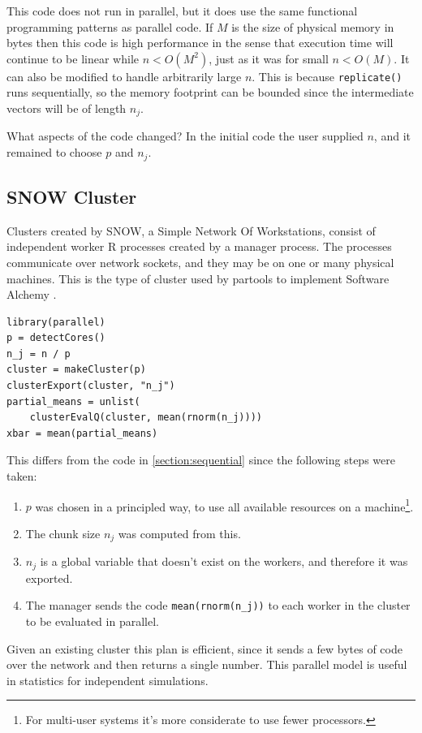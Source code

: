 \documentclass[12pt]{article}
\begin{document}
This code does not run in parallel, but it does use the same functional
programming patterns as parallel code. If $M$ is the size of physical memory in
bytes then this code is high performance in the sense
that execution time will continue to be linear while $n < O(M^2)$, just
as it was for small $n < O(M)$. It can also be modified to handle
arbitrarily large $n$. This is because \texttt{replicate()} runs
sequentially, so the memory footprint can be bounded since the intermediate
vectors will be of length $n_j$. 

What aspects of the code changed? In the initial code the user
supplied $n$, and it remained to choose $p$ and $n_j$.

\subsection{SNOW Cluster}

Clusters created by SNOW, a Simple Network Of Workstations,
consist of independent worker R processes created by a manager process. The
processes communicate over network sockets, and they may be on one or many
physical machines.  This is the type of cluster used by partools to
implement Software Alchemy \cite{R-partools} \cite{matloff2014software}.  

\begin{verbatim}
library(parallel)
p = detectCores()
n_j = n / p
cluster = makeCluster(p)
clusterExport(cluster, "n_j")
partial_means = unlist(
    clusterEvalQ(cluster, mean(rnorm(n_j))))
xbar = mean(partial_means)
\end{verbatim}

This differs from the code in \ref{section:sequential} since
the following steps were taken:
\begin{enumerate}
    \item $p$ was chosen in a principled way, to use all available
        resources on a machine\footnote{For multi-user systems it's more
        considerate to use fewer processors.}. 
    \item The chunk size $n_j$ was computed from this.
    \item $n_j$ is a global variable that doesn't exist on
        the workers, and therefore it was exported.
    \item The manager sends the code \texttt{mean(rnorm(n\_j))} to each
        worker in the cluster to be evaluated in parallel. 
\end{enumerate}

Given an existing cluster this plan is efficient, since it
sends a few bytes of code over the network and then returns a single
number. This parallel model is useful in statistics for independent
simulations.
\end{document}
